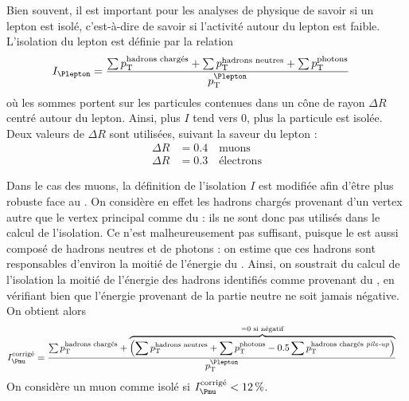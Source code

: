 Bien souvent, il est important pour les analyses de physique de savoir si un lepton est isolé, c'est-à-dire de savoir si l'activité autour du lepton est faible. L'isolation du lepton est définie par la relation
\begin{align*}
  I_{\Plepton} &= \frac{\sum{\pt^\text{hadrons chargés}} + \sum{\pt^\text{hadrons neutres}} + \sum{\pt^\text{photons}}}{\pt^{\Plepton}}
\end{align*}
où les sommes portent sur les particules contenues dans un cône de rayon $\Delta R$ centré autour du lepton. Ainsi, plus $I$ tend vers 0, plus la particule est isolée. Deux valeurs de $\Delta R$ sont utilisées, suivant la saveur du lepton :
\begin{align*}
  \Delta R &= \num{0.4} \quad\text{muons}\\
  \Delta R &= \num{0.3} \quad\text{électrons}
\end{align*}

Dans le cas des muons, la définition de l'isolation $I$ est modifiée afin d'être plus robuste face au \pu. On considère en effet les hadrons chargés provenant d'un vertex autre que le vertex principal comme du \pu : ils ne sont donc pas utilisés dans le calcul de l'isolation. Ce n'est malheureusement pas suffisant, puisque le \pu est aussi composé de hadrons neutres et de photons : on estime que ces hadrons sont responsables d'environ la moitié de l'énergie du \pu. Ainsi, on soustrait du calcul de l'isolation la moitié de l'énergie des hadrons identifiés comme provenant du \pu, en vérifiant bien que l'énergie provenant de la partie neutre ne soit jamais négative. On obtient alors
\begin{align*}
  I_{\Pmu}^\text{corrigé} &= \frac{\sum{\pt^\text{hadrons chargés}} + \overbrace{\left(\sum{\pt^\text{hadrons neutres}} + \sum{\pt^\text{photons}} - \num{0.5} \sum{\pt^\text{hadrons chargés \pu}} \right)}^{= 0 \text{ si négatif}}}{\pt^{\Plepton}}
\end{align*}
On considère un muon comme isolé si $I_{\Pmu}^\text{corrigé} < \SI{12}{\%}$.

\smallskip

